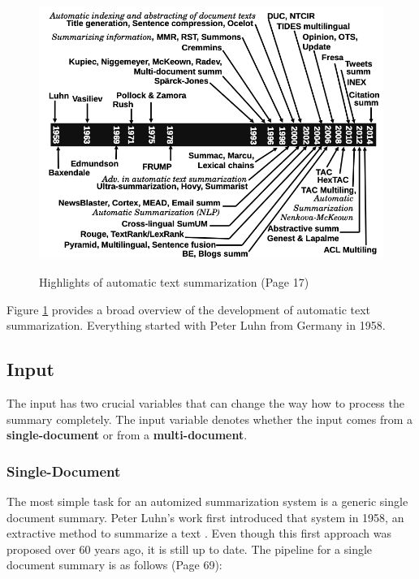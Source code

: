 \begin{figure}
	\begin{center}
		\includegraphics[width=5.5in]{photos/history}\\
		\caption{Highlights of automatic text summarization \cite{juan} (Page 17)}\label{hist}
	\end{center}
\end{figure}

Figure \ref{hist} provides a broad overview of the development of automatic text summarization. Everything started with Peter Luhn from Germany in 1958.

\subsection{Input}\label{ss:input}

The input has two crucial variables that can change the way how to process the summary completely. The input variable denotes whether the input comes from a \textbf{single-document} or from a \textbf{multi-document}. 

\subsubsection{Single-Document}\label{ss:sd}
The most simple task for an automized summarization system is a generic single document summary. Peter Luhn's work first introduced that system in 1958, an extractive method to summarize a text \cite{textmining1958}.  Even though this first approach was proposed over 60 years ago, it is still up to date. The pipeline for a single document summary is as follows \cite{juan} (Page 69):

